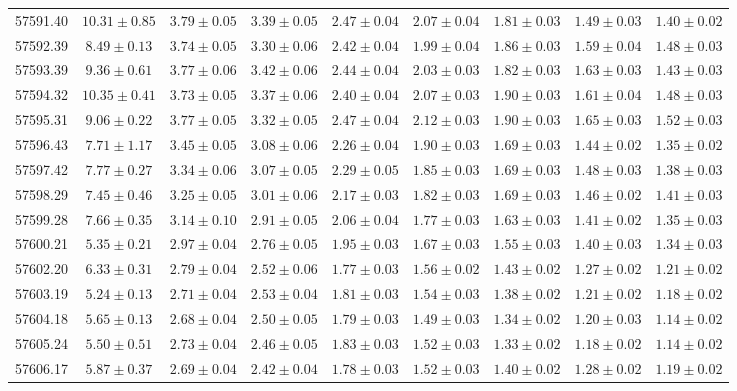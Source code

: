 \begin{table}
\begin{tabular}{lcccccccc}
		57591.40 & $10.31 \pm 0.85$ & $3.79 \pm 0.05$ & $3.39 \pm 0.05$ & $2.47 \pm 0.04$ & $2.07 \pm 0.04$ & $1.81 \pm 0.03$ & $1.49 \pm 0.03$ & $1.40 \pm 0.02$ \\
		57592.39 & $8.49 \pm 0.13$ & $3.74 \pm 0.05$ & $3.30 \pm 0.06$ & $2.42 \pm 0.04$ & $1.99 \pm 0.04$ & $1.86 \pm 0.03$ & $1.59 \pm 0.04$ & $1.48 \pm 0.03$ \\
		57593.39 & $9.36 \pm 0.61$ & $3.77 \pm 0.06$ & $3.42 \pm 0.06$ & $2.44 \pm 0.04$ & $2.03 \pm 0.03$ & $1.82 \pm 0.03$ & $1.63 \pm 0.03$ & $1.43 \pm 0.03$ \\
		57594.32 & $10.35 \pm 0.41$ & $3.73 \pm 0.05$ & $3.37 \pm 0.06$ & $2.40 \pm 0.04$ & $2.07 \pm 0.03$ & $1.90 \pm 0.03$ & $1.61 \pm 0.04$ & $1.48 \pm 0.03$ \\
		57595.31 & $9.06 \pm 0.22$ & $3.77 \pm 0.05$ & $3.32 \pm 0.05$ & $2.47 \pm 0.04$ & $2.12 \pm 0.03$ & $1.90 \pm 0.03$ & $1.65 \pm 0.03$ & $1.52 \pm 0.03$ \\
		57596.43 & $7.71 \pm 1.17$ & $3.45 \pm 0.05$ & $3.08 \pm 0.06$ & $2.26 \pm 0.04$ & $1.90 \pm 0.03$ & $1.69 \pm 0.03$ & $1.44 \pm 0.02$ & $1.35 \pm 0.02$ \\
		57597.42 & $7.77 \pm 0.27$ & $3.34 \pm 0.06$ & $3.07 \pm 0.05$ & $2.29 \pm 0.05$ & $1.85 \pm 0.03$ & $1.69 \pm 0.03$ & $1.48 \pm 0.03$ & $1.38 \pm 0.03$ \\
		57598.29 & $7.45 \pm 0.46$ & $3.25 \pm 0.05$ & $3.01 \pm 0.06$ & $2.17 \pm 0.03$ & $1.82 \pm 0.03$ & $1.69 \pm 0.03$ & $1.46 \pm 0.02$ & $1.41 \pm 0.03$ \\
		57599.28 & $7.66 \pm 0.35$ & $3.14 \pm 0.10$ & $2.91 \pm 0.05$ & $2.06 \pm 0.04$ & $1.77 \pm 0.03$ & $1.63 \pm 0.03$ & $1.41 \pm 0.02$ & $1.35 \pm 0.03$ \\
		57600.21 & $5.35 \pm 0.21$ & $2.97 \pm 0.04$ & $2.76 \pm 0.05$ & $1.95 \pm 0.03$ & $1.67 \pm 0.03$ & $1.55 \pm 0.03$ & $1.40 \pm 0.03$ & $1.34 \pm 0.03$ \\
		57602.20 & $6.33 \pm 0.31$ & $2.79 \pm 0.04$ & $2.52 \pm 0.06$ & $1.77 \pm 0.03$ & $1.56 \pm 0.02$ & $1.43 \pm 0.02$ & $1.27 \pm 0.02$ & $1.21 \pm 0.02$ \\
		57603.19 & $5.24 \pm 0.13$ & $2.71 \pm 0.04$ & $2.53 \pm 0.04$ & $1.81 \pm 0.03$ & $1.54 \pm 0.03$ & $1.38 \pm 0.02$ & $1.21 \pm 0.02$ & $1.18 \pm 0.02$ \\
		57604.18 & $5.65 \pm 0.13$ & $2.68 \pm 0.04$ & $2.50 \pm 0.05$ & $1.79 \pm 0.03$ & $1.49 \pm 0.03$ & $1.34 \pm 0.02$ & $1.20 \pm 0.03$ & $1.14 \pm 0.02$ \\
		57605.24 & $5.50 \pm 0.51$ & $2.73 \pm 0.04$ & $2.46 \pm 0.05$ & $1.83 \pm 0.03$ & $1.52 \pm 0.03$ & $1.33 \pm 0.02$ & $1.18 \pm 0.02$ & $1.14 \pm 0.02$ \\
		57606.17 & $5.87 \pm 0.37$ & $2.69 \pm 0.04$ & $2.42 \pm 0.04$ & $1.78 \pm 0.03$ & $1.52 \pm 0.03$ & $1.40 \pm 0.02$ & $1.28 \pm 0.02$ & $1.19 \pm 0.02$ \\
		\hline
	\end{tabular}
	\label{tab:conts}
\end{table}

